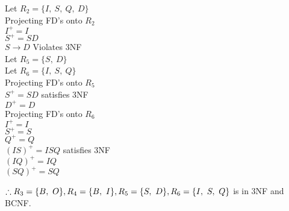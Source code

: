 \documentclass[12pt]{article}
\begin{document}
\begin{minipage}[t]{0.5\textwidth}
    Let $R_2 = \{I,\ S,\ Q,\ D\}$\\

    Projecting FD's onto $R_2$\\
    $I^+ = I$ \\
    $S^+ = SD$ \\
    $S \rightarrow D$ Violates 3NF\\

    Let $R_5 = \{S,\ D\}$\\
    Let $R_6 = \{I,\ S,\ Q\}$\\

    Projecting FD's onto $R_5$\\
    $S^+ = SD$ satisfies 3NF\\
    $D^+ = D$ \\

    Projecting FD's onto $R_6$\\
    $I ^+ = I$ \\
    $S ^+ = S$ \\
    $Q ^+ = Q$ \\
    $(IS) ^+ = ISQ$ satisfies 3NF\\
    $(IQ) ^+ = IQ$ \\
    $(SQ) ^+ = SQ$ \\
\end{minipage}

$\therefore R_3 = \{B,\ O\},\\ R_4 = \{B,\ I\},\\ R_5 = \{S,\ D\},\\ R_6 = \{I,\ S,\ Q\}$ is in 3NF and BCNF.\\
\end{document}
